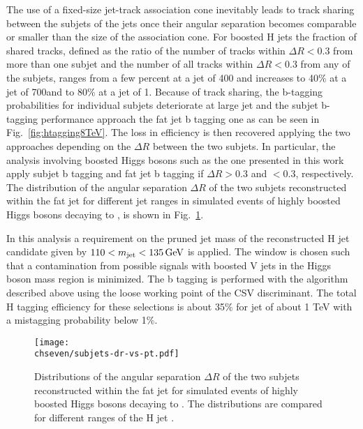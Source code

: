 The use of a fixed-size jet-track association cone inevitably leads to track sharing between the subjets of the jets once their angular separation becomes comparable
or smaller than the size of the association cone. 
For boosted H jets the fraction of shared tracks, defined as the ratio of the number of tracks within $\Delta R < 0.3$
from more than one subjet and the number of all tracks within $\Delta R < 0.3$ from any of the subjets,
ranges from a few percent at a jet \pt of 400\GeV
and increases to 40\% at a jet \pt of 700\GeV and to 80\% at a jet \pt of 1\TeV.
Because of track sharing, the b-tagging probabilities for individual subjets deteriorate at large jet \pt and the subjet b-tagging performance approach the
fat jet b tagging one as can be seen in Fig.~\ref{fig:htagging8TeV}.
The loss in efficiency is then recovered applying the two approaches depending on the $\Delta R$ between the two subjets.
In particular, the analysis involving boosted Higgs bosons such as the one presented in this work
apply subjet b tagging and fat jet b tagging if $\Delta R > 0.3$ and $< 0.3$, respectively. 
The distribution of the angular separation $\Delta R$ of the two subjets reconstructed within the fat jet for different jet \pt ranges 
in simulated events of highly boosted Higgs bosons decaying to \bbbar, is shown in Fig.~\ref{fig:subjetdR}.

In this analysis a requirement on the pruned jet mass of the reconstructed H jet candidate given by $110 < m_{\text{jet}} < 135\,\text{Ge\hspace{-.08em}V}$ is applied. The \mJ window is chosen such that a contamination from possible signals with boosted V jets in the Higgs boson mass region is minimized. The b tagging is performed with the algorithm described above using the loose working point of the CSV discriminant. The total H tagging efficiency for these selections is about 35\% for jet \pt of about 1 TeV with a mistagging probability below 1\%.

\begin{figure}[!htb]
 \begin{center}
  \texttt{[image: \\chseven/subjets-dr-vs-pt.pdf]}
 \end{center}
 \caption{\small Distributions of the angular separation $\Delta R$ of the two subjets reconstructed within the fat jet for simulated events of highly boosted Higgs bosons decaying to \bbbar. The distributions are compared for different ranges of the H jet \pt.}
 \label{fig:subjetdR}
\end{figure}

